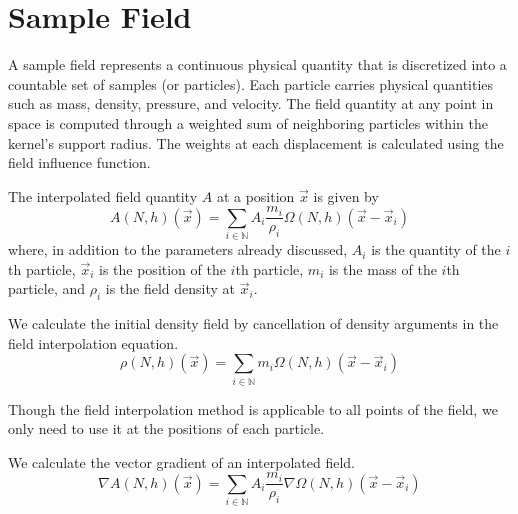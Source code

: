 
\section{Sample Field}

A sample field represents a continuous physical quantity that is discretized into a countable set of samples (or particles). Each particle carries physical quantities such as mass, density, pressure, and velocity. The field quantity at any point in space is computed through a weighted sum of neighboring particles within the kernel's support radius. The weights at each displacement is calculated using the field influence function.

\begin{definition}
    The interpolated field quantity $A$ at a position $\vec{x}$ is given by
    \begin{equation}
        A(N,h)(\vec{x}) = \sum_{i \in \mathbb{N}} A_i \frac{m_i}{\rho_i} \Omega(N,h)(\vec{x} - \vec{x}_i)
    \end{equation}
    where, in addition to the parameters already discussed, $A_i$ is the quantity of the $i$th particle, $\vec{x}_i$ is the position of the $i$th particle, $m_i$ is the mass of the $i$th particle, and $\rho_i$ is the field density at $\vec{x}_i$.
\end{definition}

\begin{theorem}
    We calculate the initial density field by cancellation of density arguments in the field interpolation equation.
    \begin{equation}
        \rho(N,h)(\vec{x}) = \sum_{i \in \mathbb{N}} m_i \Omega(N,h)(\vec{x} - \vec{x}_i)
    \end{equation}
\end{theorem}

Though the field interpolation method is applicable to all points of the field, we only need to use it at the positions of each particle.

\begin{theorem}
    We calculate the vector gradient of an interpolated field.
    \begin{equation}
        \nabla A(N,h)(\vec{x}) = \sum_{i \in \mathbb{N}} A_i \frac{m_i}{\rho_i} \nabla \Omega(N,h)(\vec{x} - \vec{x}_i)
    \end{equation}
\end{theorem}
